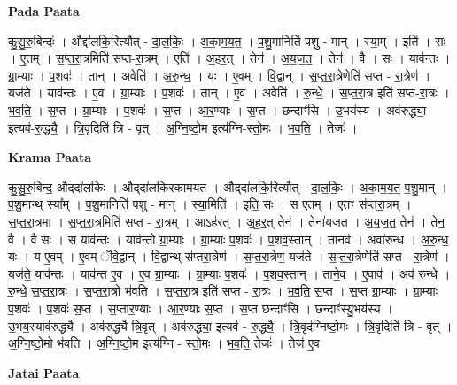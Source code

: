 \documentclass[17pt]{extarticle}
\begin{document}
\textbf{Pada Paata} \newline

कु॒सु॒रु॒बिन्दः॑ । औद्दा॑लकि॒रित्यौत् - दा॒ल॒किः॒ । अ॒का॒म॒य॒त॒ । प॒शु॒मानिति॑ पशु - मान् । स्या॒म् । इति॑ । सः । ए॒तम् । स॒प्त॒रा॒त्रमिति॑ सप्त-रा॒त्रम् । एति॑ । अ॒ह॒र॒त् । तेन॑ । अ॒य॒ज॒त॒ । तेन॑ । वै । सः । याव॑न्तः । ग्रा॒म्याः । प॒शवः॑ । तान् । अवेति॑ । अ॒रु॒न्ध॒ । यः । ए॒वम् । वि॒द्वान् । स॒प्त॒रा॒त्रेणेति॑ सप्त - रा॒त्रेण॑ । यज॑ते । याव॑न्तः । ए॒व । ग्रा॒म्याः । प॒शवः॑ । तान् । ए॒व । अवेति॑ । रु॒न्धे॒ । स॒प्त॒रा॒त्र इति॑ सप्त-रा॒त्रः । भ॒व॒ति॒ । स॒प्त । ग्रा॒म्याः । प॒शवः॑ । स॒प्त । आ॒र॒ण्याः । स॒प्त । छन्दाꣳ॑सि । उ॒भय॑स्य । अव॑रुद्ध्या॒ इत्यव॑-रु॒द्ध्यै॒ । त्रि॒वृदिति॑ त्रि - वृत् । अ॒ग्नि॒ष्टो॒म इत्य॑ग्नि-स्तो॒मः । भ॒व॒ति॒ । तेजः॑ ।  \newline


\textbf{Krama Paata} \newline

कु॒सु॒रु॒बिन्द॒ औद्‍दा॑लकिः । औद्‍दा॑लकिरकामयत । औद्‍दा॑लकि॒रित्यौत् - दा॒ल॒किः॒ । अ॒का॒म॒य॒त॒ प॒शु॒मान् । प॒शु॒मान्थ् स्या᳚म् । प॒शु॒मानिति॑ पशु - मान् । स्या॒मिति॑ । इति॒ सः । स ए॒तम् । ए॒तꣳ स॑प्तरा॒त्रम् । स॒प्त॒रा॒त्रमा । स॒प्त॒रा॒त्रमिति॑ सप्त - रा॒त्रम् । आऽह॑रत् । अ॒ह॒र॒त् तेन॑ । तेना॑यजत । अ॒य॒ज॒त॒ तेन॑ । तेन॒ वै । वै सः । स याव॑न्तः । याव॑न्तो ग्रा॒म्याः । ग्रा॒म्याः प॒शवः॑ । प॒शव॒स्तान् । तानव॑ । अवा॑रुन्ध । अ॒रु॒न्ध॒ यः । य ए॒वम् । ए॒वम् ॅवि॒द्वान् । वि॒द्वान्थ् स॑प्तरा॒त्रेण॑ । स॒प्त॒रा॒त्रेण॒ यज॑ते । स॒प्त॒रा॒त्रेणेति॑ सप्त - रा॒त्रेण॑ । यज॑ते॒ याव॑न्तः । याव॑न्त ए॒व । ए॒व ग्रा॒म्याः । ग्रा॒म्याः प॒शवः॑ । प॒शव॒स्तान् । ताने॒व । ए॒वाव॑ । अव॑ रुन्धे । रु॒न्धे॒ स॒प्त॒रा॒त्रः । स॒प्त॒रा॒त्रो भ॑वति । स॒प्त॒रा॒त्र इति॑ सप्त - रा॒त्रः । भ॒व॒ति॒ स॒प्त । स॒प्त ग्रा॒म्याः । ग्रा॒म्याः प॒शवः॑ । प॒शवः॑ स॒प्त । स॒प्तार॒ण्याः । आ॒र॒ण्याः स॒प्त । स॒प्त छन्दाꣳ॑सि । छन्दाꣳ॑स्यु॒भय॑स्य । उ॒भय॒स्याव॑रुद्ध्यै । अव॑रुद्ध्यै त्रि॒वृत् । अव॑रुद्ध्या॒ इत्यव॑ - रु॒द्ध्यै॒ । त्रि॒वृद॑ग्निष्टो॒मः । त्रि॒वृदिति॑ त्रि - वृत् । अ॒ग्नि॒ष्टो॒मो भ॑वति । अ॒ग्नि॒ष्टो॒म इत्य॑ग्नि - स्तो॒मः । भ॒व॒ति॒ तेजः॑ । तेज॑ ए॒व \newline

\textbf{Jatai Paata} \newline
\end{document}
